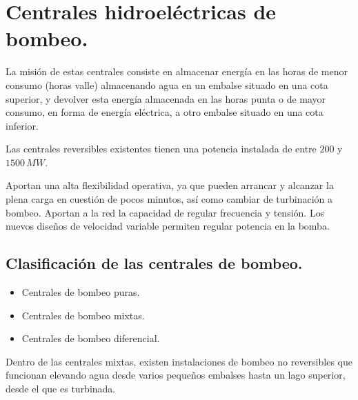 \chapter{Centrales hidroeléctricas de bombeo.}
	La misión de estas centrales consiste en almacenar energía en las horas de menor consumo (horas valle) almacenando agua en un embalse situado en una cota superior, y devolver esta energía almacenada en las horas punta o de mayor consumo, en forma de energía eléctrica, a otro embalse situado en una cota inferior.
	
	
	Las centrales reversibles existentes tienen una potencia instalada de entre $200$ y $1500\,MW$.
	
	
	Aportan una alta flexibilidad operativa, ya que pueden arrancar y alcanzar la plena carga en cuestión de pocos minutos, así como cambiar de turbinación a bombeo. Aportan a la red la capacidad de regular frecuencia y tensión. Los nuevos diseños de velocidad variable permiten regular potencia en la bomba.
	
	\section{Clasificación de las centrales de bombeo.}
		\begin{itemize}
			\item Centrales de bombeo puras.
			\item Centrales de bombeo mixtas.
			\item Centrales de bombeo diferencial.
		\end{itemize}
		
		Dentro de las centrales mixtas, existen instalaciones de bombeo no reversibles que funcionan elevando agua desde varios pequeños embalses hasta un lago superior, desde el que es turbinada.
		
